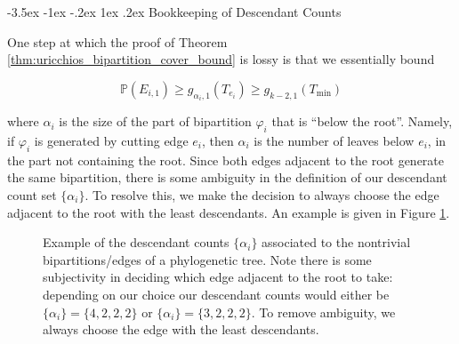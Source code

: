 \documentclass[10pt,oneside,reqno]{article}
\makeatletter
\theoremstyle{plain}
\theoremstyle{definition}
\numberwithin{equation}{section}
\def\subsection#1{\@startsection {subsection}{2}{0pt}%
{-3.5ex \@plus -1ex \@minus -.2ex}%
{1ex \@plus.2ex}%
{\bf\mathversion{bold}}{#1}}
\renewcommand{\geq}{\geqslant}
\renewcommand{\phi}{\varphi}
\renewcommand{\P}{\mathbb{P}}
\makeatother
\begin{document}
\subsection{Bookkeeping of Descendant Counts}
\label{sec:first-improvement-descendant-counts}

One step at which the proof of Theorem \ref{thm:uricchios_bipartition_cover_bound} is lossy is that we essentially bound

\[\P(E_{i,1}) \geq g_{\alpha_{i}, 1}(T_{e_i}) \geq g_{k-2, 1}(T_{\mathrm{min}})\]

\noindent where $\alpha_{i}$ is the size of the part of bipartition $\phi_i$ that is ``below the root''. Namely, if $\phi_i$ is generated by cutting edge $e_i$, then $\alpha_{i}$ is the number of leaves below $e_i$, in the part not containing the root. Since both edges adjacent to the root generate the same bipartition, there is some ambiguity in the definition of our descendant count set $\{\alpha_i\}$. To resolve this, we make the decision to always choose the edge adjacent to the root with the least descendants. An example is given in Figure \ref{fig:example_descendants_alpha_i}.

\begin{figure}[h]
\centering
{}
\caption{Example of the descendant counts $\{\alpha_i\}$ associated to the nontrivial bipartitions/edges of a phylogenetic tree. Note there is some subjectivity in deciding which edge adjacent to the root to take: depending on our choice our descendant counts would either be $\{\alpha_i\} = \{4,2,2,2\}$ or $\{\alpha_i\} = \{3,2,2,2\}$. To remove ambiguity, we always choose the edge with the least descendants.}
\label{fig:example_descendants_alpha_i}
\end{figure}
\end{document}
